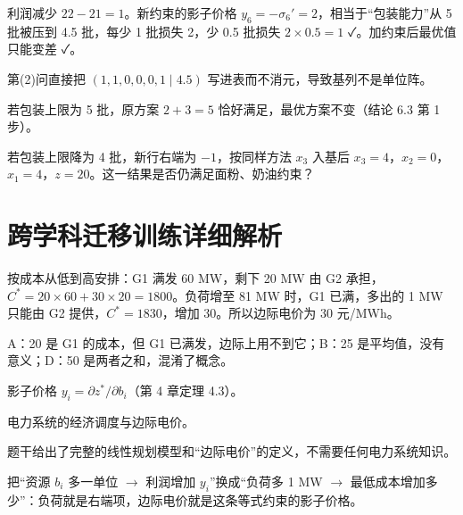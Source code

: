 利润减少 $22-21=1$。新约束的影子价格 $y_6=-\sigma_6'=2$，相当于“包装能力”从 5 批被压到 4.5 批，每少 1 批损失 2，少 0.5 批损失 $2\times0.5=1$ ✓。加约束后最优值只能变差 ✓。\par
{}第(2)问直接把 $(1,1,0,0,0,1\mid4.5)$ 写进表而不消元，导致基列不是单位阵。\par
{}若包装上限为 5 批，原方案 $2+3=5$ 恰好满足，最优方案不变（结论 6.3 第 1 步）。\par
{}若包装上限降为 4 批，新行右端为 $-1$，按同样方法 $x_3$ 入基后 $x_3=4$，$x_2=0$，$x_1=4$，$z=20$。这一结果是否仍满足面粉、奶油约束？

\section*{跨学科迁移训练详细解析}

按成本从低到高安排：G1 满发 60 MW，剩下 20 MW 由 G2 承担，$C^*=20\times60+30\times20=1800$。负荷增至 81 MW 时，G1 已满，多出的 1 MW 只能由 G2 提供，$C^*=1830$，增加 30。所以边际电价为 30 元/MWh。
\begin{figure}[!htbp]\centering
{}
\end{figure}
A：20 是 G1 的成本，但 G1 已满发，边际上用不到它；B：25 是平均值，没有意义；D：50 是两者之和，混淆了概念。\par
{}影子价格 $y_i=\partial z^*/\partial b_i$（第 4 章定理 4.3）。\par
{}电力系统的经济调度与边际电价。\par
{}题干给出了完整的线性规划模型和“边际电价”的定义，不需要任何电力系统知识。\par
{}把“资源 $b_i$ 多一单位 $\to$ 利润增加 $y_i$”换成“负荷多 1 MW $\to$ 最低成本增加多少”：负荷就是右端项，边际电价就是这条等式约束的影子价格。


